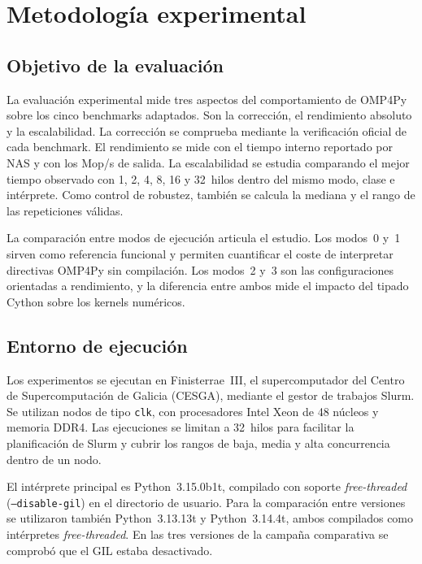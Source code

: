 \chapter{Metodología experimental}
\label{chap:metodologia}

\section{Objetivo de la evaluación}
\label{sec:objetivo-evaluacion}

La evaluación experimental mide tres aspectos del comportamiento de OMP4Py sobre
los cinco benchmarks adaptados. Son la corrección, el rendimiento absoluto y
la escalabilidad. La corrección se comprueba mediante la verificación oficial de
cada benchmark. El rendimiento se mide con el tiempo interno reportado por NAS
y con los Mop/s de salida. La escalabilidad se estudia comparando el mejor
tiempo observado con 1, 2, 4, 8, 16 y 32~hilos dentro del mismo modo, clase e
intérprete. Como control de robustez, también se calcula la mediana y el rango
de las repeticiones válidas.

La comparación entre modos de ejecución articula el estudio. Los modos~0 y~1
sirven como referencia funcional y permiten cuantificar el coste de interpretar
directivas OMP4Py sin compilación. Los modos~2 y~3 son las configuraciones
orientadas a rendimiento, y la diferencia entre ambos mide el impacto del tipado
Cython sobre los kernels numéricos.


\section{Entorno de ejecución}
\label{sec:entorno-ejecucion}

Los experimentos se ejecutan en Finisterrae~III, el supercomputador del Centro
de Supercomputación de Galicia (CESGA), mediante el gestor de trabajos Slurm.
Se utilizan nodos de tipo \texttt{clk}, con procesadores Intel Xeon de 48 núcleos
y memoria DDR4. Las ejecuciones se limitan a 32~hilos para facilitar la
planificación de Slurm y cubrir los rangos de baja, media y alta concurrencia
dentro de un nodo.

El intérprete principal es Python~3.15.0b1t, compilado con soporte
\emph{free-threaded} (\texttt{--disable-gil}) en el directorio de usuario. Para
la comparación entre versiones se utilizaron también Python~3.13.13t y
Python~3.14.4t, ambos compilados como intérpretes \emph{free-threaded}. En las
tres versiones de la campaña comparativa se comprobó que el GIL estaba
desactivado.

